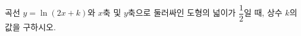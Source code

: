 \hspace*{2mm}\begin{minipage}[t]{\dimexpr\linewidth-2mm\relax}\vspace{0pt}
곡선 $y=\ln(2x+k)$와 $x$축 및 $y$축으로 둘러싸인 도형의 넓이가 $\dfrac{1}{2}$일 때, 상수 $k$의 값을 구하시오. \end{minipage}
